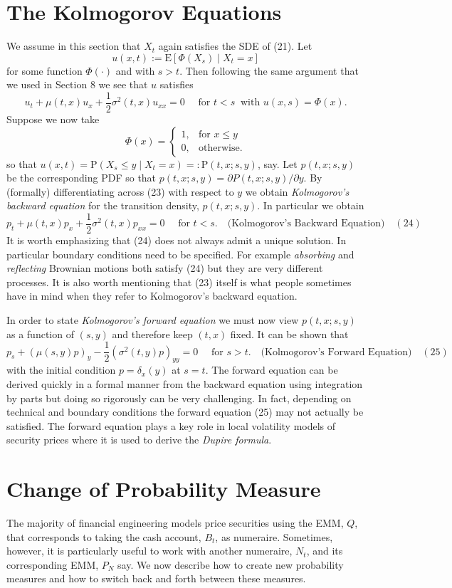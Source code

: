 \section{The Kolmogorov Equations}
We assume in this section that $X_t$ again satisfies the SDE of (21). Let
\[u(x,t) := \mathrm{E}\left[\Phi(X_s) \mid X_t=x\right]\]
for some function $\Phi(\cdot)$ and with $s>t$. Then following the same argument that we used in Section 8 we see that $u$ satisfies
\[u_t + \mu(t,x) u_x + \frac{1}{2}\sigma^2(t,x) u_{xx} = 0 \quad \text{ for } t<s \ \text{ with } u(x,s)=\Phi(x). \tag{23}\]
Suppose we now take
\[\Phi(x) = \begin{cases}
1, & \text{for } x\leq y \\
0, & \text{otherwise}.
\end{cases}\]
so that $u(x,t)=\mathrm{P}\left(X_s\leq y \mid X_t=x\right)=:\mathrm{P}(t,x;s,y)$, say. Let $p(t,x;s,y)$ be the corresponding PDF so that $p(t,x;s,y)=\partial P(t,x;s,y)/\partial y$. By (formally) differentiating across (23) with respect to $y$ we obtain \textit{Kolmogorov's backward equation} for the transition density, $p(t,x;s,y)$. In particular we obtain
\[p_t + \mu(t,x) p_x + \frac{1}{2}\sigma^2(t,x) p_{xx} = 0 \quad \text{ for } t<s. \quad \text{(Kolmogorov's Backward Equation)} \quad(24)\]
It is worth emphasizing that (24) does not always admit a unique solution. In particular boundary conditions need to be specified. For example \textit{absorbing} and \textit{reflecting} Brownian motions both satisfy (24) but they are very different processes. It is also worth mentioning that (23) itself is what people sometimes have in mind when they refer to Kolmogorov's backward equation.

In order to state \textit{Kolmogorov's forward equation} we must now view $p(t,x;s,y)$ as a function of $(s,y)$ and therefore keep $(t,x)$ fixed. It can be shown that
\[p_s + (\mu(s,y)p)_y - \frac{1}{2}(\sigma^2(t,y)p)_{yy} = 0 \quad \text{ for } s>t. \quad \text{(Kolmogorov's Forward Equation)} \quad(25)\]
with the initial condition $p=\delta_x(y)$ at $s=t$. The forward equation can be derived quickly in a formal manner from the backward equation using integration by parts but doing so rigorously can be very challenging. In fact, depending on technical and boundary conditions the forward equation (25) may not actually be satisfied. The forward equation plays a key role in local volatility models of security prices where it is used to derive the \textit{Dupire formula}.

\section{Change of Probability Measure}
The majority of financial engineering models price securities using the EMM, $Q$, that corresponds to taking the cash account, $B_t$, as numeraire. Sometimes, however, it is particularly useful to work with another numeraire, $N_t$, and its corresponding EMM, $P_N$ say. We now describe how to create new probability measures and how to switch back and forth between these measures.

